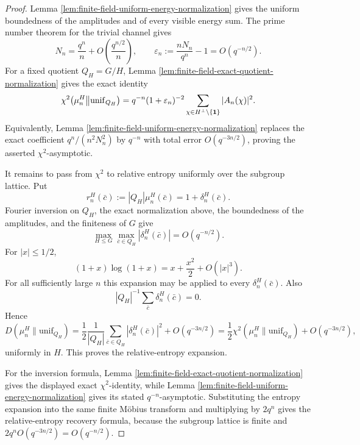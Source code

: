 \begin{proof}
Lemma \ref{lem:finite-field-uniform-energy-normalization} gives the uniform boundedness of the amplitudes and of every visible energy sum. The prime number theorem for the trivial channel gives
\[
N_n=\frac{q^n}{n}+O\!\left(\frac{q^{n/2}}{n}\right),
\qquad
\varepsilon_n:=\frac{nN_n}{q^n}-1=O(q^{-n/2}).
\]
For a fixed quotient \(Q_H=G/H\), Lemma \ref{lem:finite-field-exact-quotient-normalization} gives the exact identity
\[
\chi^2\!\left(\mu_n^H\middle\|\mathrm{unif}_{Q_H}\right)
=
q^{-n}(1+\varepsilon_n)^{-2}
\sum_{\chi\in H^\perp\setminus\{\mathbf{1}\}}|A_n(\chi)|^2.
\]
Equivalently, Lemma \ref{lem:finite-field-uniform-energy-normalization} replaces the exact coefficient \(q^n/(n^2N_n^2)\) by \(q^{-n}\) with total error \(O(q^{-3n/2})\), proving the asserted \(\chi^2\)-asymptotic.

It remains to pass from \(\chi^2\) to relative entropy uniformly over the subgroup lattice. Put
\[
r_n^H(\bar c):=|Q_H|\mu_n^H(\bar c)=1+\delta_n^H(\bar c).
\]
Fourier inversion on \(Q_H\), the exact normalization above, the boundedness of the amplitudes, and the finiteness of \(G\) give
\[
\max_{H\le G}\max_{\bar c\in Q_H}|\delta_n^H(\bar c)|=O(q^{-n/2}).
\]
For \(|x|\le1/2\),
\[
(1+x)\log(1+x)=x+\frac{x^2}{2}+O(|x|^3).
\]
For all sufficiently large \(n\) this expansion may be applied to every \(\delta_n^H(\bar c)\). Also
\[
|Q_H|^{-1}\sum_{\bar c}\delta_n^H(\bar c)=0.
\]
Hence
\[
D(\mu_n^H\|\mathrm{unif}_{Q_H})
=
\frac12\frac1{|Q_H|}\sum_{\bar c\in Q_H}|\delta_n^H(\bar c)|^2
+O(q^{-3n/2})
=
\frac12\chi^2(\mu_n^H\|\mathrm{unif}_{Q_H})+O(q^{-3n/2}),
\]
uniformly in \(H\). This proves the relative-entropy expansion.

For the inversion formula, Lemma \ref{lem:finite-field-exact-quotient-normalization} gives the displayed exact \(\chi^2\)-identity, while Lemma \ref{lem:finite-field-uniform-energy-normalization} gives its stated \(q^{-n}\)-asymptotic. Substituting the entropy expansion into the same finite M\"obius transform and multiplying by \(2q^n\) gives the relative-entropy recovery formula, because the subgroup lattice is finite and \(2q^nO(q^{-3n/2})=O(q^{-n/2})\).
\end{proof}
